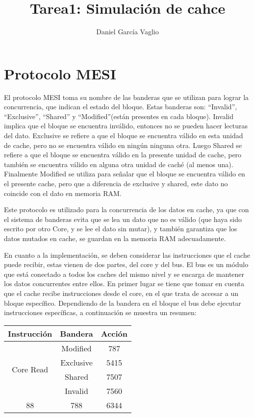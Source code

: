 \documentclass {article}
\begin{document}
\title{Tarea1: Simulación de cahce}
\author{Daniel García Vaglio}
\maketitle



\section{Protocolo MESI}
El protocolo MESI toma su nombre de las banderas que se utilizan para lograr la concurrencia, que
indican el estado del bloque. Estas banderas son: ``Invalid'', ``Exclusive'', ``Shared'' y
``Modified''(están presentes en cada bloque). Invalid implica que el bloque se encuentra inválido, entonces no se pueden hacer
lecturas del dato. Exclusive se refiere a que el bloque se encuentra válido en esta unidad de cache,
pero no se encuentra válido en ningún ninguna otra. Luego Shared se refiere a que el bloque se
encuentra válido en la presente unidad de cache, pero también se encuentra válido en alguna otra
unidad de caché (al menos una). Finalmente Modified se utiliza para señalar que el bloque se
encuentra válido en el presente cache, pero que a diferencia de exclusive y shared, este dato no
coincide con el dato en memoria RAM.

Este protocolo es utilizado para la concurrencia de los datos en cache, ya que con el sistema de
banderas evita que se lea un dato que no es válido (que haya sido escrito por otro Core, y se lee el
dato sin mutar), y también garantiza que los datos mutados en cache, se guardan en la memoria RAM
adecuadamente.

En cuanto a la implementación, se deben considerar las instrucciones que el cache puede recibir,
estas vienen de dos partes, del core y del bus. El bus es un módulo que está conectado a todos los
caches del mismo nivel y se encarga de mantener los datos concurrentes entre ellos. En primer lugar
se tiene que tomar en cuenta que el cache recibe instrucciones desde el core, en el que trata de
accesar a un bloque específico. Dependiendo de la bandera en el bloque el bus debe ejecutar
instrucciones específicas, a continuación se muestra un resumen:
\begin{center}
 \begin{tabular}{|c | c | c |} 
 \hline
 Instrucción & Bandera & Acción \\ 
 \hline
 \multirow{4}{4em}{Core Read}  & Modified & 787 \\ 
   
  & Exclusive & 5415 \\
 
  & Shared & 7507 \\
 
  & Invalid & 7560 \\
 \hline
  88 & 788 & 6344 \\ [1ex] 
 \hline
 \end{tabular}
\end{center}
\end{document}
